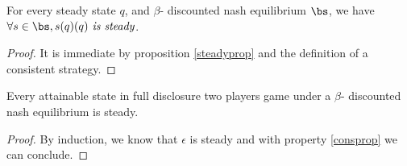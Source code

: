 \begin{myprop}
	\label{consprop}
	For every steady state $q$, and $\beta$- discounted nash equilibrium $\bs$, we have $\forall s \in \bs, s(q)(q) \textit{ is steady}$.
\end{myprop}
\begin{proof}
	It is immediate by proposition \ref{steadyprop} and the definition of a consistent strategy.
\end{proof}

\begin{myprop}
	Every attainable state in full disclosure two players game under a $\beta$- discounted nash equilibrium is steady.
\end{myprop}
\begin{proof}
	By induction, we know that $\epsilon$ is steady and with property \ref{consprop} we can conclude. 
\end{proof}